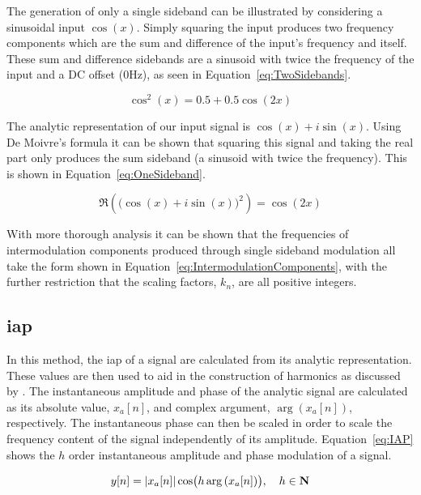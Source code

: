 		The generation of only a single sideband can be illustrated by considering a sinusoidal input $\cos(x)$.
		Simply squaring the input produces two frequency components which are the sum and difference of the input's
		frequency and itself. These sum and difference sidebands are a sinusoid with twice the frequency of the
		input and a DC offset (0Hz), as seen in Equation~\ref{eq:TwoSidebands}.

		\begin{equation}
			\cos^{2}(x) = 0.5 + 0.5 \cos(2x)
			\label{eq:TwoSidebands}
		\end{equation}

		The analytic representation of our input signal is $\cos(x) + i\sin(x)$. Using De Moivre's formula it can
		be shown that squaring this signal and taking the real part only produces the sum sideband (a sinusoid with
		twice the frequency). This is shown in Equation~\ref{eq:OneSideband}.

		\begin{equation}
			\Re \left( \bigl( \cos(x) + i\sin(x) \bigr)^{2} \right) = \cos(2x)
			\label{eq:OneSideband}
		\end{equation}

		With more thorough analysis it can be shown that the frequencies of intermodulation components produced
		through single sideband modulation all take the form shown in Equation~\ref{eq:IntermodulationComponents},
		with the further restriction that the scaling factors, $k_{n}$, are all positive integers.

	\subsection{\acrlong{iap}}
	\label{sec:Excitation-Methods-IAP}
		In this method, the \acrfull{iap} of a signal are calculated from its analytic representation. These values
		are then used to aid in the construction of harmonics as discussed by \citet{puckette2007patch}. The
		instantaneous amplitude and phase of the analytic signal are calculated as its absolute value,
		$x_{a}[n]$, and complex argument, $\arg \left( x_{a}[n] \right)$, respectively. The
		instantaneous phase can then be scaled in order to scale the frequency content of the signal independently
		of its amplitude.  Equation~\ref{eq:IAP} shows the $h$ order instantaneous amplitude and phase
		modulation of a signal.

		\begin{equation}
			y[n] = \left|x_{a}[n]\right| \cos \bigl( h\arg \left( x_{a}[n] \right) \bigr), \quad h \in \textbf{N}
			\label{eq:IAP}
		\end{equation}


